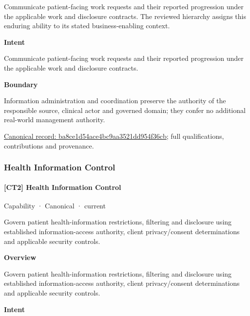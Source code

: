 Communicate patient-facing work requests and their reported progression under the applicable work and disclosure contracts. The reviewed hierarchy assigns this enduring ability to its stated business-enabling context.



\textbf{Intent}



Communicate patient-facing work requests and their reported progression under the applicable work and disclosure contracts.



\textbf{Boundary}



Information administration and coordination preserve the authority of the responsible source, clinical actor and governed domain; they confer no additional real-world management authority.


{\footnotesize \href{../../../../continuum/strategy/capability/ba8ce1d54ace4bc9aa3521dd954f36cb.md}{Canonical record: ba8ce1d54ace4bc9aa3521dd954f36cb}; full qualifications, contributions and provenance.}\par
\subsubsection{Health Information Control}

\paragraph{[CT2] Health Information Control}

\label{element:44cc0e17ad534675bf26dce6e46a68ff}
{\small Capability · Canonical · current}\par

Govern patient health-information restrictions, filtering and disclosure using established information-access authority, client privacy/consent determinations and applicable security controls.



\textbf{Overview}



Govern patient health-information restrictions, filtering and disclosure using established information-access authority, client privacy/consent determinations and applicable security controls.



\textbf{Intent}




